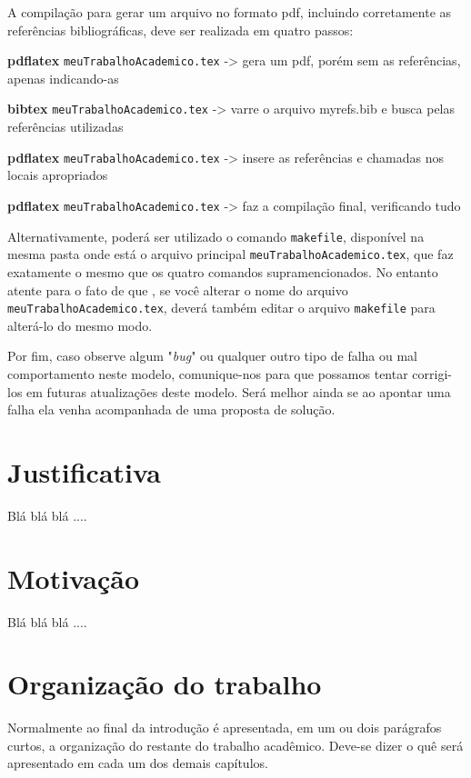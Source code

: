 A compilação para gerar um arquivo no formato pdf, incluindo corretamente as referências bibliográficas, deve ser realizada em quatro passos:

\begin{compactitem}
	\item \textbf{pdflatex} \verb|meuTrabalhoAcademico.tex|    -> gera um pdf, porém sem as referências, apenas indicando-as
	\item \textbf{bibtex} \verb|meuTrabalhoAcademico.tex|	-> varre o arquivo myrefs.bib e busca pelas referências utilizadas
	\item \textbf{pdflatex} \verb|meuTrabalhoAcademico.tex|	-> insere as referências e chamadas nos locais apropriados
	\item \textbf{pdflatex} \verb|meuTrabalhoAcademico.tex|	-> faz a compilação final, verificando tudo
\end{compactitem}

Alternativamente, poderá ser utilizado o comando \verb|makefile|, disponível na mesma pasta onde está o arquivo principal \verb|meuTrabalhoAcademico.tex|, que faz exatamente o mesmo que os quatro comandos supramencionados. No entanto atente para o fato de que , se você alterar o nome do arquivo \verb|meuTrabalhoAcademico.tex|, deverá também editar o arquivo \verb|makefile| para alterá-lo do mesmo modo.

Por fim, caso observe algum "\textit{bug}"{} ou qualquer outro tipo de falha ou mal comportamento neste modelo, comunique-nos para que possamos tentar corrigi-los em futuras atualizações deste modelo. Será melhor ainda se ao apontar uma falha ela venha acompanhada de uma proposta de solução.



\section{Justificativa}
\label{sec:justificativa}

Blá blá blá .... 



\section{Motivação}
\label{sec:motivacao}

Blá blá blá ....



\section{Organização do trabalho}
\label{sec:organizacaoTrabalho}


Normalmente ao final da introdução é apresentada, em um ou dois parágrafos curtos, a organização do restante do trabalho acadêmico. Deve-se dizer o quê será apresentado em cada um dos demais capítulos.

